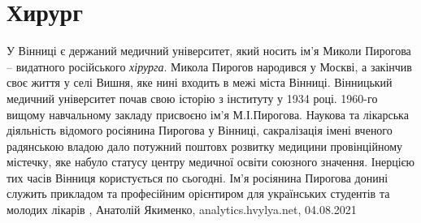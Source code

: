  
 
 
 
 
\chapter{Хирург}
\label{sec:slova.hirurg}

У Вінниці є держаний медичний університет, який носить ім’я Миколи Пирогова –
видатного російського \emph{хірурга}. Микола Пирогов народився у Москві, а закінчив
своє життя у селі Вишня, яке нині входить в межі міста Вінниці.
Вінницький медичний університет почав свою історію з інституту у 1934 році.
1960-го вищому навчальному закладу присвоєно ім’я М.І.Пирогова. Наукова та
лікарська діяльність відомого росіянина Пирогова у Вінниці, сакралізація імені
вченого радянською владою дало потужний поштовх розвитку медицини провінційному
містечку, яке набуло статусу центру медичної освіти союзного значення. Інерцією
тих часів Вінниця користується по сьогодні. Ім’я росіянина Пирогова донині
служить прикладом та професійним орієнтиром для українських студентів та
молодих лікарів
, 
Анатолій Якименко, analytics.hvylya.net, 04.08.2021
